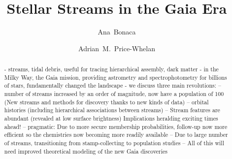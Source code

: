 \documentclass[final,5p,times,twocolumn,authoryear]{elsarticle}
\begin{document}
\begin{frontmatter}



\title{Stellar Streams in the Gaia Era}


\author[ociw]{Ana~Bonaca}
\author[cca]{Adrian~M.~Price-Whelan}




\begin{abstract}
- streams, tidal debris, useful for tracing hierarchical assembly, dark matter 
- in the Milky Way, the Gaia mission, providing astrometry and spectrophotometry for billions of stars, fundamentally changed the landscape
- we discuss three main revolutions:
-- number of streams increased by an order of magnitude, now have a population of 100 (New streams and methods for discovery thanks to new kinds of data)
-- orbital histories (including hierarchical associations between streams)
-- Stream features are abundant (revealed at low surface brightness)
Implications heralding exciting times ahead!
-- pragmatic: Due to more secure membership probabilities, follow-up now more efficient so the chemistries now becoming more readily available
-- Due to large number of streams, transitioning from stamp-collecting to population studies
-- All of this will need improved theoretical modeling of the new Gaia discoveries
\end{abstract}


\end{frontmatter}
\end{document}
